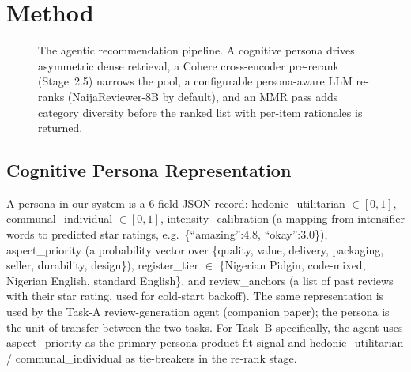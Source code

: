 \documentclass[sigconf,nonacm,balance]{acmart}
\begin{document}
\section{Method}

\begin{figure}[t]
  \centering
  \caption{The agentic recommendation pipeline. A cognitive persona drives
  asymmetric dense retrieval, a Cohere cross-encoder pre-rerank (Stage~2.5)
  narrows the pool, a configurable persona-aware LLM re-ranks (NaijaReviewer-8B
  by default), and an MMR pass adds category diversity before the ranked list
  with per-item rationales is returned.}
  \label{fig:pipeline-b}
\end{figure}

\subsection{Cognitive Persona Representation}

A persona in our system is a 6-field JSON record:
\textsf{hedonic\_utilitarian} $\in [0,1]$,
\textsf{communal\_individual} $\in [0,1]$,
\textsf{intensity\_calibration} (a mapping from intensifier words to
predicted star ratings, e.g.\ \textsf{\{``amazing'':4.8, ``okay'':3.0\}}),
\textsf{aspect\_priority} (a probability vector over
\{quality, value, delivery, packaging, seller, durability, design\}),
\textsf{register\_tier} $\in$ \{Nigerian Pidgin, code-mixed,
Nigerian English, standard English\}, and \textsf{review\_anchors}
(a list of past reviews with their star rating, used for cold-start
backoff). The same representation is used by the Task-A review-generation
agent (companion paper); the persona is the unit of transfer between
the two tasks. For Task~B specifically, the agent uses
\textsf{aspect\_priority} as the primary persona-product fit signal and
\textsf{hedonic\_utilitarian} / \textsf{communal\_individual} as
tie-breakers in the re-rank stage.
\end{document}
